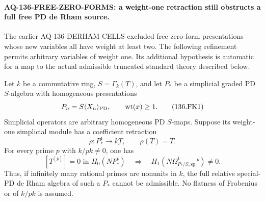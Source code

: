 \paragraph{AQ-136-FREE-ZERO-FORMS: a weight-one retraction still obstructs a full free PD de Rham source.}
The earlier AQ-136-DERHAM-CELLS excluded free zero-form
presentations whose new variables all have weight at least two.
The following refinement permits arbitrary variables of weight
one. Its additional hypothesis is automatic for a map to the
actual admissible truncated standard theory described below.

Let $k$ be a commutative ring, $S=\Gamma_k(T)$, and let $P_*$
be a simplicial graded PD $S$-algebra with homogeneous
presentations
\[
                  P_n=S\langle X_n\rangle_{\rm PD},
                \qquad \operatorname{wt}(x)\ge1.
                                                               \tag{136.FK1}
\]
Simplicial operators are arbitrary homogeneous PD $S$-maps.
Suppose its weight-one simplicial module has a coefficient
retraction
\[
          \rho:P_*^1\longrightarrow\underline{kT},
                            \qquad \rho(T)=T.              \tag{136.FK2}
\]
For every prime $p$ with $k/pk\ne0$, one has
\[
 [T^{[p]}]=0\text{ in }H_0(NP_*^p)
       \quad\Longrightarrow\quad
 H_1\!\left(N\Omega^1_{P_*/S,\mathrm{sp}}{}^{\,p}\right)\ne0.
                                                               \tag{136.FK3}
\]
Thus, if infinitely many rational primes are nonunits in $k$,
the full relative special-PD de Rham algebra of such a $P_*$
cannot be admissible. No flatness of Frobenius or of $k/pk$
is assumed.

